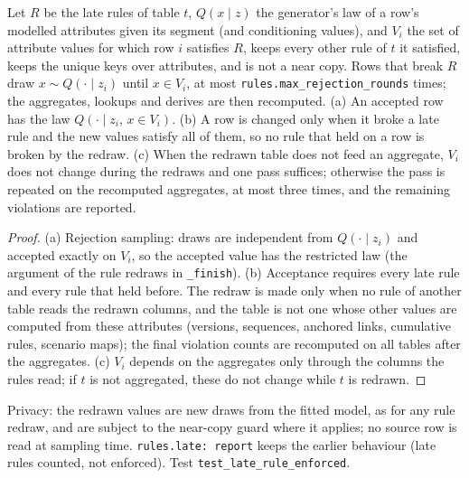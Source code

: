 \setcounter{proposition}{1880}
\begin{proposition}\label{prop:laterules}
Let $R$ be the late rules of table $t$, $Q(x\mid z)$ the generator's law of a row's modelled attributes given its segment (and conditioning values), and $V_i$ the set of attribute values for which row $i$ satisfies $R$, keeps every other rule of $t$ it satisfied, keeps the unique keys over attributes, and is not a near copy. Rows that break $R$ draw $x\sim Q(\cdot\mid z_i)$ until $x\in V_i$, at most \texttt{rules.max\_rejection\_rounds} times; the aggregates, lookups and derives are then recomputed. (a) An accepted row has the law $Q(\cdot\mid z_i,\,x\in V_i)$. (b) A row is changed only when it broke a late rule and the new values satisfy all of them, so no rule that held on a row is broken by the redraw. (c) When the redrawn table does not feed an aggregate, $V_i$ does not change during the redraws and one pass suffices; otherwise the pass is repeated on the recomputed aggregates, at most three times, and the remaining violations are reported.
\end{proposition}
\begin{proof}
(a) Rejection sampling: draws are independent from $Q(\cdot\mid z_i)$ and accepted exactly on $V_i$, so the accepted value has the restricted law (the argument of the rule redraws in \texttt{\_finish}). (b) Acceptance requires every late rule and every rule that held before. The redraw is made only when no rule of another table reads the redrawn columns, and the table is not one whose other values are computed from these attributes (versions, sequences, anchored links, cumulative rules, scenario maps); the final violation counts are recomputed on all tables after the aggregates. (c) $V_i$ depends on the aggregates only through the columns the rules read; if $t$ is not aggregated, these do not change while $t$ is redrawn.
\end{proof}
\noindent Privacy: the redrawn values are new draws from the fitted model, as for any rule redraw, and are subject to the near-copy guard where it applies; no source row is read at sampling time. \texttt{rules.late: report} keeps the earlier behaviour (late rules counted, not enforced). Test \texttt{test\_late\_rule\_enforced}.

\setcounter{proposition}{\value{savedproplatekeys}}
